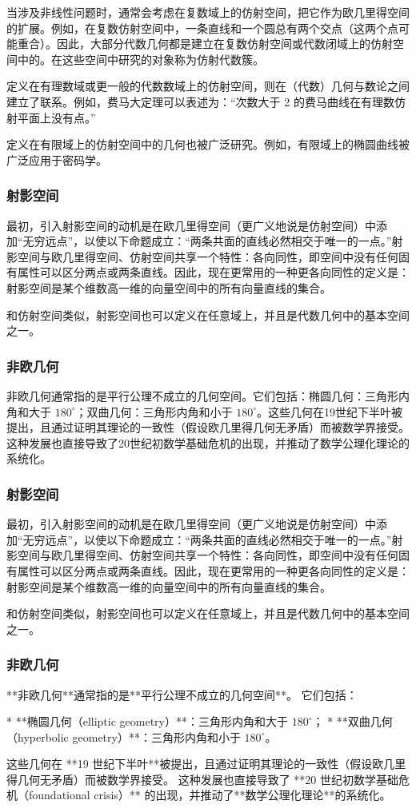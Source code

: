 当涉及非线性问题时，通常会考虑在复数域上的仿射空间，把它作为欧几里得空间的扩展。例如，在复数仿射空间中，一条直线和一个圆总有两个交点（这两个点可能重合）。因此，大部分代数几何都是建立在复数仿射空间或代数闭域上的仿射空间中的。在这些空间中研究的对象称为仿射代数簇。

定义在有理数域或更一般的代数数域上的仿射空间，则在（代数）几何与数论之间建立了联系。例如，费马大定理可以表述为：“次数大于 2 的费马曲线在有理数仿射平面上没有点。”

定义在有限域上的仿射空间中的几何也被广泛研究。例如，有限域上的椭圆曲线被广泛应用于密码学。
\subsubsection{射影空间}
最初，引入射影空间的动机是在欧几里得空间（更广义地说是仿射空间）中添加“无穷远点”，以使以下命题成立：“两条共面的直线必然相交于唯一的一点。”射影空间与欧几里得空间、仿射空间共享一个特性：各向同性，即空间中没有任何固有属性可以区分两点或两条直线。因此，现在更常用的一种更各向同性的定义是：射影空间是某个维数高一维的向量空间中的所有向量直线的集合。

和仿射空间类似，射影空间也可以定义在任意域上，并且是代数几何中的基本空间之一。
\subsubsection{非欧几何}
非欧几何通常指的是平行公理不成立的几何空间。它们包括：椭圆几何：三角形内角和大于 $180^\circ$；双曲几何：三角形内角和小于 $180^\circ$。这些几何在19世纪下半叶被提出，且通过证明其理论的一致性（假设欧几里得几何无矛盾）而被数学界接受。这种发展也直接导致了20世纪初数学基础危机的出现，并推动了数学公理化理论的系统化。
\subsubsection{射影空间}
最初，引入射影空间的动机是在欧几里得空间（更广义地说是仿射空间）中添加“无穷远点”，以使以下命题成立：“两条共面的直线必然相交于唯一的一点。”射影空间与欧几里得空间、仿射空间共享一个特性：各向同性，即空间中没有任何固有属性可以区分两点或两条直线。因此，现在更常用的一种更各向同性的定义是：射影空间是某个维数高一维的向量空间中的所有向量直线的集合。

和仿射空间类似，射影空间也可以定义在任意域上，并且是代数几何中的基本空间之一。
\subsubsection{非欧几何}
**非欧几何**通常指的是**平行公理不成立的几何空间**。
它们包括：

* **椭圆几何（elliptic geometry）**：三角形内角和大于 $180^\circ$；
* **双曲几何（hyperbolic geometry）**：三角形内角和小于 $180^\circ$。

这些几何在 **19 世纪下半叶**被提出，且通过证明其理论的一致性（假设欧几里得几何无矛盾）而被数学界接受。
这种发展也直接导致了 **20 世纪初数学基础危机（foundational crisis）** 的出现，并推动了**数学公理化理论**的系统化。
